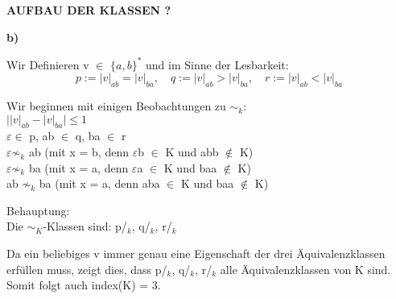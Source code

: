 \documentclass[a4paper,graphics,11pt]{article}
\begin{document}
\textbf{AUFBAU DER KLASSEN ?}

\textbf{b)}


Wir Definieren v $\in$ $\lbrace a,b \rbrace^*$ und im Sinne der Lesbarkeit:\\
$$
	p := |v|_{ab} = |v|_{ba},\quad q := |v|_{ab} > |v|_{ba}, \quad r := |v|_{ab} < |v|_{ba}
$$

Wir beginnen mit einigen Beobachtungen zu $\sim_k$:\\
$\textbf{|}|v|_{ab} - |v|_{ba}\textbf{|} \leq 1$ \\
$\varepsilon \in$ p, ab $\in$ q, ba $\in$ r\\
$\varepsilon \not\sim_k$ ab (mit x = b, denn $\varepsilon$b $\in$ K und abb $\not\in$ K)\\
$\varepsilon \not\sim_k$ ba (mit x = a, denn $\varepsilon$a $\in$ K und baa $\not\in$ K)\\
ab $\not\sim_k$ ba (mit x = a, denn aba $\in$ K und baa $\not\in$ K)

Behauptung:\\
Die $\sim_K$-Klassen sind: p/$_k$, q/$_k$, r/$_k$

Da ein beliebiges v immer genau eine Eigenschaft der drei Äquivalenzklassen erfüllen muss, zeigt dies, dass p/$_k$, q/$_k$, r/$_k$ alle Äquivalenzklassen von K sind.\\
Somit folgt auch index(K) = 3.
\end{document}
